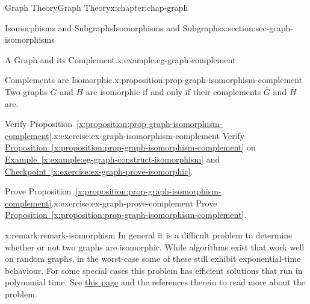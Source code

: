 \documentclass[oneside,10pt,]{book}
\newcommand{\xreffont}{\relax}
\numberwithin{equation}{section}
\begin{document}
\begin{chapterptx}{Graph Theory}{}{Graph Theory}{}{}{x:chapter:chap-graph}
\begin{sectionptx}{Isomorphisms and Subgraphs}{}{Isomorphisms and Subgraphs}{}{}{x:section:sec-graph-isomorphisms}
\begin{example}{A Graph and its Complement.}{x:example:eg-graph-complement}
\begin{sidebyside}{3}{0.15}{0.15}{0.02}
\begin{sbspanel}{0.22}
{
}%
\end{sbspanel}%
\end{sidebyside}%
\end{example}
\begin{proposition}{Complements are Isomorphic.}{}{x:proposition:prop-graph-isomorphism-complement}%
Two graphs \(G\) and \(H\) are isomorphic if and only if their complements \(\overline{G}\) and \(\overline{H}\) are.%
\end{proposition}
\begin{inlineexercise}{Verify Proposition~{\xreffont\ref*{x:proposition:prop-graph-isomorphism-complement}}.}{x:exercise:ex-graph-isomorphism-complement}%
Verify \hyperref[x:proposition:prop-graph-isomorphism-complement]{Proposition~{\xreffont\ref{x:proposition:prop-graph-isomorphism-complement}}} on \hyperref[x:example:eg-graph-construct-isomorphism]{Example~{\xreffont\ref{x:example:eg-graph-construct-isomorphism}}} and \hyperref[x:exercise:ex-graph-prove-isomorphic]{Checkpoint~{\xreffont\ref{x:exercise:ex-graph-prove-isomorphic}}}.%
\end{inlineexercise}
\begin{inlineexercise}{Prove Proposition~{\xreffont\ref*{x:proposition:prop-graph-isomorphism-complement}}.}{x:exercise:ex-graph-prove-complement}%
Prove \hyperref[x:proposition:prop-graph-isomorphism-complement]{Proposition~{\xreffont\ref{x:proposition:prop-graph-isomorphism-complement}}}.%
\end{inlineexercise}
\begin{remark}{}{x:remark:remark-isomorphism}%
In general it is a difficult problem to determine whether or not two graphs are isomorphic. While algorithms exist that work well on random graphs, in the worst-case some of these still exhibit exponential-time behaviour. For some special cases this problem has efficient solutions that run in polynomial time. See \href{https://en.wikipedia.org/wiki/Graph_Isomorphism_Problem}{this page} and the references therein to read more about the problem.%
\end{remark}
\end{sectionptx}

\end{chapterptx}
\end{document}

